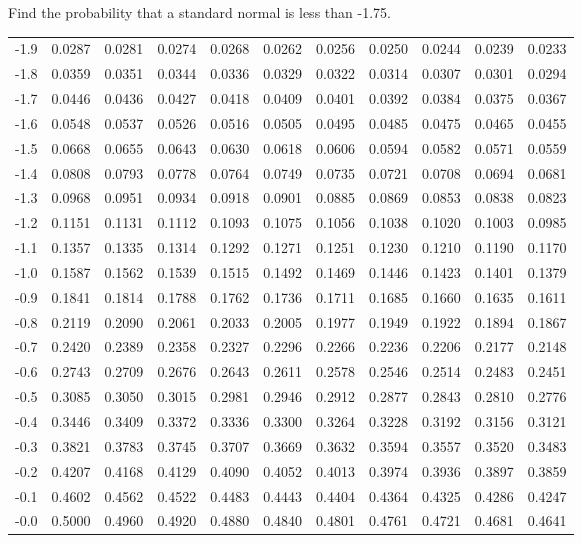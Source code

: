 \begin{frame}{\small Find the probability that a standard normal is less than -1.75.}
{\begin{tabular}{l|llllllllll}
-1.9 & 0.0287 & 0.0281 & 0.0274 & 0.0268 & 0.0262 & 0.0256 & 0.0250 & 0.0244 & 0.0239 & 0.0233 \\ 
-1.8 & 0.0359 & 0.0351 & 0.0344 & 0.0336 & 0.0329 & 0.0322 & 0.0314 & 0.0307 & 0.0301 & 0.0294 \\ 
\rowcolor{red} -1.7 & 0.0446 & 0.0436 & 0.0427 & 0.0418 & 0.0409 & 0.0401 & 0.0392 & 0.0384 & 0.0375 & 0.0367 \\ 
-1.6 & 0.0548 & 0.0537 & 0.0526 & 0.0516 & 0.0505 & 0.0495 & 0.0485 & 0.0475 & 0.0465 & 0.0455 \\ 
-1.5 & 0.0668 & 0.0655 & 0.0643 & 0.0630 & 0.0618 & 0.0606 & 0.0594 & 0.0582 & 0.0571 & 0.0559 \\ 
-1.4 & 0.0808 & 0.0793 & 0.0778 & 0.0764 & 0.0749 & 0.0735 & 0.0721 & 0.0708 & 0.0694 & 0.0681 \\ 
-1.3 & 0.0968 & 0.0951 & 0.0934 & 0.0918 & 0.0901 & 0.0885 & 0.0869 & 0.0853 & 0.0838 & 0.0823 \\ 
-1.2 & 0.1151 & 0.1131 & 0.1112 & 0.1093 & 0.1075 & 0.1056 & 0.1038 & 0.1020 & 0.1003 & 0.0985 \\ 
-1.1 & 0.1357 & 0.1335 & 0.1314 & 0.1292 & 0.1271 & 0.1251 & 0.1230 & 0.1210 & 0.1190 & 0.1170 \\ 
-1.0 & 0.1587 & 0.1562 & 0.1539 & 0.1515 & 0.1492 & 0.1469 & 0.1446 & 0.1423 & 0.1401 & 0.1379 \\ 
-0.9 & 0.1841 & 0.1814 & 0.1788 & 0.1762 & 0.1736 & 0.1711 & 0.1685 & 0.1660 & 0.1635 & 0.1611 \\ 
-0.8 & 0.2119 & 0.2090 & 0.2061 & 0.2033 & 0.2005 & 0.1977 & 0.1949 & 0.1922 & 0.1894 & 0.1867 \\ 
-0.7 & 0.2420 & 0.2389 & 0.2358 & 0.2327 & 0.2296 & 0.2266 & 0.2236 & 0.2206 & 0.2177 & 0.2148 \\ 
-0.6 & 0.2743 & 0.2709 & 0.2676 & 0.2643 & 0.2611 & 0.2578 & 0.2546 & 0.2514 & 0.2483 & 0.2451 \\ 
-0.5 & 0.3085 & 0.3050 & 0.3015 & 0.2981 & 0.2946 & 0.2912 & 0.2877 & 0.2843 & 0.2810 & 0.2776 \\ 
-0.4 & 0.3446 & 0.3409 & 0.3372 & 0.3336 & 0.3300 & 0.3264 & 0.3228 & 0.3192 & 0.3156 & 0.3121 \\ 
-0.3 & 0.3821 & 0.3783 & 0.3745 & 0.3707 & 0.3669 & 0.3632 & 0.3594 & 0.3557 & 0.3520 & 0.3483 \\ 
-0.2 & 0.4207 & 0.4168 & 0.4129 & 0.4090 & 0.4052 & 0.4013 & 0.3974 & 0.3936 & 0.3897 & 0.3859 \\ 
-0.1 & 0.4602 & 0.4562 & 0.4522 & 0.4483 & 0.4443 & 0.4404 & 0.4364 & 0.4325 & 0.4286 & 0.4247 \\ 
-0.0 & 0.5000 & 0.4960 & 0.4920 & 0.4880 & 0.4840 & 0.4801 & 0.4761 & 0.4721 & 0.4681 & 0.4641 
\end{tabular}


}


\end{frame}

